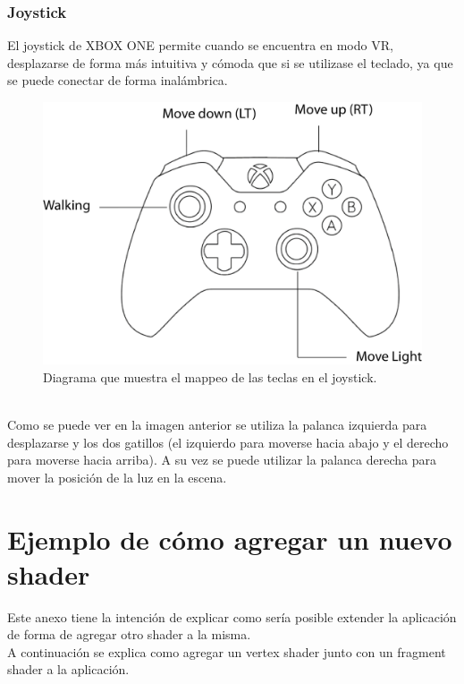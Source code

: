 \documentclass[12pt]{article}
\begin{document}
\subsubsection{Joystick}
El joystick de XBOX ONE permite cuando se encuentra en modo VR, desplazarse de forma más intuitiva y cómoda que si se utilizase el teclado, ya que se puede conectar de forma inalámbrica.\\
\begin{figure}[h]
\includegraphics[width=0.8\linewidth]{joystick.png}
\caption{Diagrama que muestra el mappeo de las teclas en el joystick.}
\end{figure}
\\Como se puede ver en la imagen anterior se utiliza la palanca izquierda para desplazarse y los dos gatillos (el izquierdo para moverse hacia abajo y el derecho para moverse hacia arriba). A su vez se puede utilizar la palanca derecha para mover la posición de la luz en la escena.
\clearpage
\section{Ejemplo de cómo agregar un nuevo shader}
Este anexo tiene la intención de explicar como sería posible extender la aplicación de forma de agregar otro shader a la misma.
\\A continuación se explica como agregar un vertex shader junto con un fragment shader a la aplicación.
\end{document}
